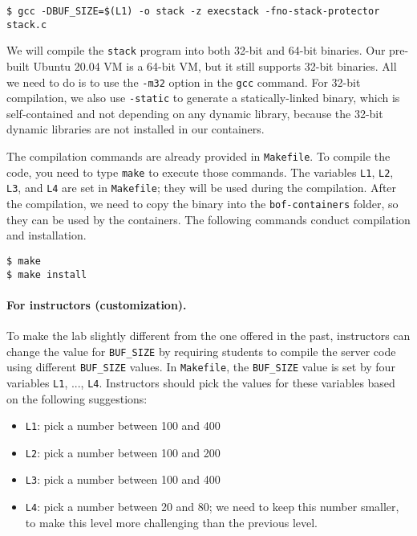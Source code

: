 \begin{lstlisting}
$ gcc -DBUF_SIZE=$(L1) -o stack -z execstack -fno-stack-protector stack.c
\end{lstlisting}

\ifdefined\arm
\else
We will compile the \texttt{stack} program into both 32-bit and 64-bit 
binaries. Our pre-built Ubuntu 20.04 VM is a 64-bit VM, but it 
still supports 32-bit binaries. All we need to do is to 
use the \texttt{-m32} option in the \texttt{gcc} command. 
For 32-bit compilation, we also use \texttt{-static} to generate 
a statically-linked binary, which is self-contained and not depending
on any dynamic library, because the 32-bit dynamic libraries 
are not installed in our containers. 
\fi

The compilation commands are already provided in \texttt{Makefile}. To compile
the code, you need to type \texttt{make} to execute those commands.
The variables \texttt{L1}, \texttt{L2}, \texttt{L3}, and \texttt{L4} are
set in \texttt{Makefile}; they will be used during the compilation.
After the compilation, we need to copy the binary into
the \texttt{bof-containers} folder, so they can be used by the 
containers. The following commands conduct compilation and 
installation.

\begin{lstlisting}
$ make
$ make install
\end{lstlisting}
 

\paragraph{For instructors (customization).}
To make the lab slightly different from the one offered in the past,
instructors can change the value for \texttt{BUF\_SIZE} by requiring
students to compile the server code using different \texttt{BUF\_SIZE} values.
In \texttt{Makefile}, the \texttt{BUF\_SIZE} value is set by
four variables \texttt{L1}, ..., \texttt{L4}.
Instructors should pick the values for these variables based
on the following suggestions:

\begin{itemize}[noitemsep]
\item \texttt{L1}: pick a number between 100 and 400
\item \texttt{L2}: pick a number between 100 and 200
\item \texttt{L3}: pick a number between 100 and 400
\item \texttt{L4}: pick a number between 20 and 80;
we need to keep this number smaller, to make this level more challenging 
than the previous level. 
\end{itemize}



